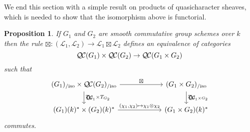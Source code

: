 \documentclass{amsart}
\theoremstyle{plain}
\newtheorem{proposition}[theorem]{Proposition}
\theoremstyle{definition}
\theoremstyle{remark}
\newcommand{\Fq}{k}
\newcommand{\qcs}[1]{{\mathcal{#1}}}
\newcommand{\QC}{{\mathcal{Q\hskip-0.8pt C}}}
\newcommand{\QCiso}[1]{\QC(#1)_{/\text{iso}}}
\newcommand{\TrFrob}[1]{T_{#1}}
\begin{document}
We end this section with a simple result on products of quasicharacter sheaves,
which is needed to show that the isomorphism above is functorial.

\begin{proposition}\label{prop:product}
If $G_1$ and $G_2$ are smooth commutative group schemes over $\Fq$ then the rule
$\boxtimes : (\qcs{L}_1,\qcs{L}_2)\to \qcs{L}_1\boxtimes\qcs{L}_2$ defines an equivalence of categories
\[
\QC(G_1)\times \QC(G_2) \to \QC(G_1\times G_2)
\]
such that
\[
\begin{tikzcd}[column sep=60]
\arrow{d}{\TrFrob{G_1} \times \TrFrob{G_2}} \QCiso{G_1}\times \QCiso{G_2} \arrow{r}{\boxtimes}
& \arrow{d}{\TrFrob{G_1\times G_2}} \QCiso{G_1\times G_2}\\
(G_1)(\Fq)^*\times (G_2)(\Fq)^* \arrow{r}{(\chi_1,\chi_2)\mapsto \chi_1\otimes \chi_2}  & (G_1\times G_2)(\Fq)^*
\end{tikzcd}
\]
commutes.
\end{proposition}
\end{document}
